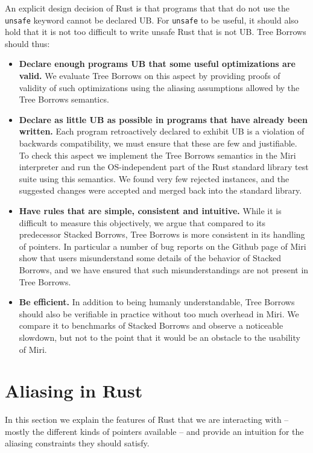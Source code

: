 \documentclass[a4paper,11pt]{article}
\theoremstyle{plain}
\theoremstyle{definition}
\theoremstyle{remark}
\begin{document}
An explicit design decision of Rust is that programs that that do not use the
\texttt{unsafe} keyword cannot be declared UB. For \texttt{unsafe} to be useful,
it should also hold that it is not too difficult to write unsafe Rust that is not
UB. Tree Borrows should thus:
\begin{itemize}
    \item \textbf{Declare enough programs UB that some useful optimizations are valid.}
        We evaluate Tree Borrows on this aspect by providing proofs of validity of such
        optimizations using the aliasing assumptions allowed by the Tree Borrows semantics.
    \item \textbf{Declare as little UB as possible in programs that have already been written.}
        Each program retroactively declared to exhibit UB is a violation of backwards compatibility,
        we must ensure that these are few and justifiable.
        To check this aspect we implement the Tree Borrows semantics in the Miri
        interpreter and run the OS-independent part of the Rust standard library
        test suite using this semantics. We found very few rejected instances, and
        the suggested changes were accepted and merged back into the standard library.
    \item \textbf{Have rules that are simple, consistent and intuitive.}
        While it is difficult to measure this objectively, we argue that compared
        to its predecessor Stacked Borrows, Tree Borrows is more consistent in
        its handling of pointers. In particular a number of bug reports on the
        Github page of Miri show that users misunderstand some details of the
        behavior of Stacked Borrows, and we have ensured that such misunderstandings
        are not present in Tree Borrows.
    \item \textbf{Be efficient.} In addition to being humanly understandable, Tree Borrows
        should also be verifiable in practice without too much overhead in Miri.
        We compare it to benchmarks of Stacked Borrows and observe a noticeable slowdown,
        but not to the point that it would be an obstacle to the usability of Miri.
\end{itemize}

\section{Aliasing in Rust}

In this section we explain the features of Rust that we are interacting with --
mostly the different kinds of pointers available -- and provide an intuition
for the aliasing constraints they should satisfy.
\end{document}
